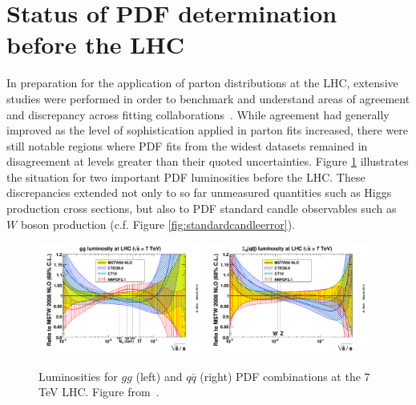 \section{Status of PDF determination before the LHC}
In preparation for the application of parton distributions at the LHC, extensive studies were performed in order to benchmark and understand areas of agreement and discrepancy across fitting collaborations~\cite{Watt:2011kp,Dittmar:2009ii}. While agreement had generally improved as the level of sophistication applied in parton fits increased, there were still notable regions where PDF fits from the widest datasets remained in disagreement at levels greater than their quoted uncertainties. Figure \ref{fig:pdflumidiff} illustrates the situation for two important PDF luminosities before the LHC. These discrepancies extended not only to so far unmeasured quantities such as Higgs production cross sections, but also to PDF standard candle observables such as $W$ boson production (c.f. Figure \ref{fig:standardcandleerror}).

\begin{figure}[t]
\centering
\includegraphics[width=0.48\textwidth]{3-PDFdet/figs/ratiogglumi1_68cl.pdf}
\includegraphics[width=0.48\textwidth]{3-PDFdet/figs/ratioqqbarlumi1_68cl.pdf}
\caption[Luminosities for $gg$ and $q\bar{q}$ PDF combinations at the $7$ TeV LHC]{Luminosities for $gg$ (left) and $q\bar{q}$ (right) PDF combinations at the $7$ TeV LHC. Figure from~\cite{Watt:2011kp}.}
\label{fig:pdflumidiff}
\end{figure}


